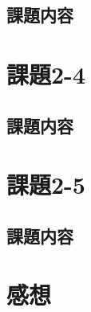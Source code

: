 \documentclass[a4j,11pt]{jarticle}
\begin{document}
\subsection{課題内容}

\section{課題2-4}
\subsection{課題内容}

\section{課題2-5}

\subsection{課題内容}

\section{感想}
\end{document}
